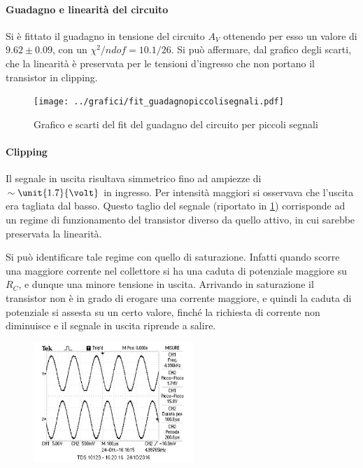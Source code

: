 \documentclass[10pt,a4paper]{article}
\begin{document}
\paragraph{Guadagno e linearità del circuito}
Si è fittato il guadagno in tensione del circuito $A_V$ ottenendo per esso un valore di $9.62 \pm 0.09$, con un $\chi^2 / ndof = 10.1 / 26$. Si può affermare, dal grafico degli scarti, che la linearità è preservata per le tensioni d'ingresso che non portano il transistor in clipping.

\begin{figure}
\centering
\begin{minipage}[c]{0.7\textwidth}
\centering
\texttt{[image: ../grafici/fit\_guadagnopiccolisegnali.pdf]}
\end{minipage}
\caption{Grafico e scarti del fit del guadagno del circuito per piccoli segnali}
\end{figure}

\paragraph{Clipping}
Il segnale in uscita risultava simmetrico fino ad ampiezze di $\sim \unit{1.7}{\volt}$ in ingresso.
Per intensità maggiori si osservava che l'uscita era tagliata dal basso. Questo taglio del segnale (riportato in \figurename{\ref{fig:clipping}}) corrisponde ad un regime di funzionamento del transistor diverso da quello attivo, in cui sarebbe preservata la linearità.

Si può identificare tale regime con quello di saturazione. Infatti quando scorre una maggiore corrente nel collettore si ha una caduta di potenziale maggiore su $R_C$, e dunque una minore tensione in uscita. Arrivando in saturazione il transistor non è in grado di erogare una corrente maggiore, e quindi la caduta di potenziale si assesta su un certo valore, finché la richiesta di corrente non diminuisce e il segnale in uscita riprende a salire.

\begin{figure}[h!]
	\centering
	\includegraphics[width=0.54\textwidth]{../oscilloscopio/firstclipbasso.jpg}
	\caption{}
	\label{fig:clipping}
\end{figure}
\end{document}
